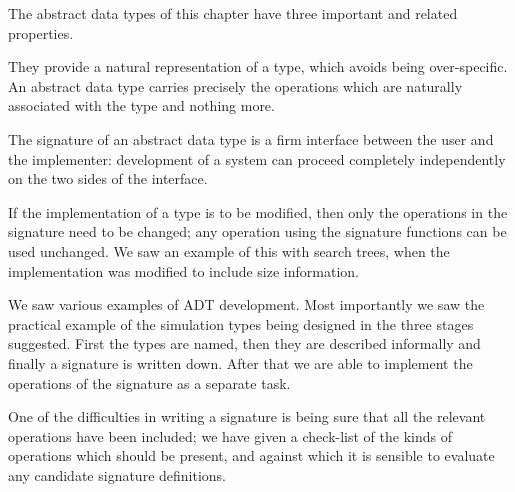 \begin{summary}
The abstract data types of this chapter have three
important and related properties.
\begin{titemize}
\item They provide a natural representation of a type,
which avoids being over-specific. An abstract data type carries precisely
the operations which are naturally associated with the type  and
nothing more.
\item The signature of an abstract data type
is a firm interface between the user
and the implementer: development of a system can proceed completely
independently on the two sides of the interface.
\item If the implementation of a type is to be modified,
then only the operations in the signature need to be changed;
any operation using the signature functions can be used
unchanged. We saw an example of this with search trees, when
the implementation  was modified to include size information.
\end{titemize}
We saw various examples of ADT development. Most importantly we saw
the practical example of the simulation types being designed in the three
stages suggested. First the types are named, then they are described
informally  and finally a signature is written down. After that we are able
to implement the operations of the signature as a separate task.

One of the difficulties in writing a signature is being sure that all the
relevant operations have been included; we have given a check-list of the kinds of
operations which should be present, and against which it is sensible to
evaluate any candidate signature definitions. 


\end{summary}


%
